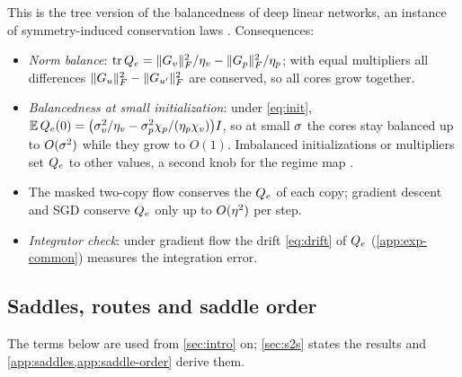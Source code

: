 This is the tree version of the balancedness of deep linear networks, an instance of
symmetry-induced conservation laws \citep{kunin2021neural}. Consequences:
\begin{itemize}
  \item \emph{Norm balance}: $\operatorname{tr}Q_{e}=\lVert G_{v}\rVert_{F}^2/\eta_{v}-\lVert G_{p}\rVert_{F}^2/\eta_{p}$; with equal
    multipliers all differences $\lVert G_{u}\rVert_{F}^2-\lVert G_{u'}\rVert_{F}^2$ are conserved, so all cores grow
    together.
  \item \emph{Balancedness at small initialization}: under \eqref{eq:init},
    $\mathbb{E}\,Q_{e}(0)=\big(\sigma_{v}^2/\eta_{v}-\sigma_{p}^2\chi_{p}/(\eta_{p}\chi_{v})\big)I$, so at small $\sigma$
    the cores stay balanced up to $O(\sigma^2)$ while they grow to $O(1)$. Imbalanced initializations
    or multipliers set $Q_{e}$ to other values, a second knob for the regime map
    \citep{kunin2024get}.
  \item The masked two-copy flow conserves the $Q_{e}$ of each copy; gradient descent and SGD conserve
    $Q_{e}$ only up to $O(\eta^2)$ per step.
  \item \emph{Integrator check}: under gradient flow the drift \eqref{eq:drift} of $Q_{e}$
    (\cref{app:exp-common}) measures the integration error.
\end{itemize}

\subsection{Saddles, routes and saddle order}\label{sec:setup-routes}

The terms below are used from \cref{sec:intro} on; \cref{sec:s2s} states the results and
\cref{app:saddles,app:saddle-order} derive them.

